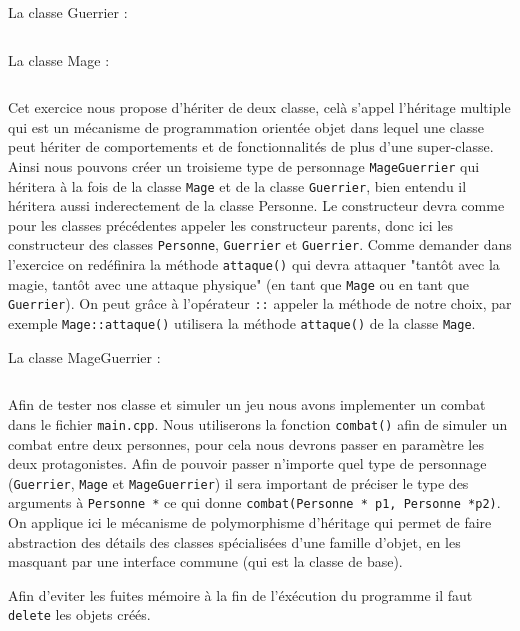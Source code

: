 La classe Guerrier :
\inputminted[linenos,firstline=12, lastline=23]{cpp}{../sources/cpp/TP9-10/Guerrier.h}

La classe Mage :
\inputminted[linenos,firstline=12, lastline=26]{cpp}{../sources/cpp/TP9-10/Mage.h}

Cet exercice nous propose d'hériter de deux classe, celà s'appel l'héritage multiple qui est un mécanisme de programmation orientée objet dans lequel une classe peut hériter de comportements et de fonctionnalités de plus d'une super-classe.
Ainsi nous pouvons créer un troisieme type de personnage \texttt{MageGuerrier} qui héritera à la fois de la classe \texttt{Mage} et de la classe \texttt{Guerrier}, bien entendu il héritera aussi inderectement de la classe Personne.
Le constructeur devra comme pour les classes précédentes appeler les constructeur parents, donc ici les constructeur des classes \texttt{Personne}, \texttt{Guerrier} et \texttt{Guerrier}.
Comme demander dans l'exercice on redéfinira la méthode \texttt{attaque()} qui devra attaquer "tantôt avec la magie, tantôt avec une attaque physique" (en tant que \texttt{Mage} ou en tant que \texttt{Guerrier}). On peut grâce à l'opérateur \texttt{::} appeler la méthode de notre choix, par exemple \texttt{Mage::attaque()} utilisera la méthode \texttt{attaque()} de la classe \texttt{Mage}.

La classe MageGuerrier :
\inputminted[linenos,firstline=7, lastline=21]{cpp}{../sources/cpp/TP9-10/MageGuerrier.cpp}

Afin de tester nos classe et simuler un jeu nous avons implementer un combat dans le fichier \texttt{main.cpp}.
Nous utiliserons la fonction \texttt{combat()} afin de simuler un combat entre deux personnes, pour cela nous devrons passer en paramètre les deux protagonistes.
Afin de pouvoir passer n'importe quel type de personnage (\texttt{Guerrier}, \texttt{Mage} et \texttt{MageGuerrier}) il sera important de préciser le type des arguments à \texttt{Personne *} ce qui donne \texttt{combat(Personne * p1, Personne *p2)}.
On applique ici le mécanisme de polymorphisme d'héritage qui permet de faire abstraction des détails des classes spécialisées d'une famille d'objet, en les masquant par une interface commune (qui est la classe de base).

Afin d'eviter les fuites mémoire à la fin de l'éxécution du programme il faut \texttt{delete} les objets créés.

\inputminted[linenos,firstline=43, lastline=60]{cpp}{../sources/cpp/TP9-10/main.cpp}
